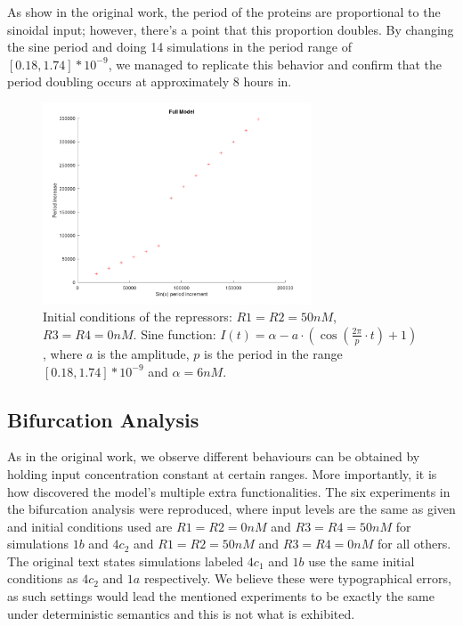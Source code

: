     As show in the original work, the period of the proteins are proportional to the sinoidal input; however, there's a point that this proportion doubles. By changing the sine period and doing 14 simulations in the period range of $[0.18, 1.74] * 10^{-9}$, we managed to replicate this behavior and confirm that the period doubling occurs at approximately 8 hours in.

    \begin{figure}[!htbp]
      \centering
      \includegraphics[width=0.71\textwidth]{img/period.png}
      \caption{Initial conditions of the repressors: $R1 = R2 = 50nM$, $R3 = R4 = 0nM$. Sine function: $I(t) = \alpha - a\cdot(\cos(\frac{2\pi}{p}\cdot t) + 1)$, where $a$ is the amplitude, $p$ is the period in the range $[0.18, 1.74] * 10^{-9}$ and $\alpha = 6nM$.}
      \label{fig.bifurcation-1a}
    \end{figure}

  \subsection{Bifurcation Analysis}

    As in the original work, we observe different behaviours can be obtained by holding input concentration constant at certain ranges.
    More importantly, it is how \citet{originals} discovered the model's multiple extra functionalities.
    The six experiments in the bifurcation analysis were reproduced, where input levels are the same as given and initial conditions used are $R1=R2=0nM$ and $R3=R4=50nM$ for simulations $1b$ and $4c_{2}$ and $R1=R2=50nM$ and $R3=R4=0nM$ for all others.
    The original text states simulations labeled $4c_{1}$ and $1b$ use the same initial conditions as $4c_{2}$ and $1a$ respectively.
    We believe these were typographical errors, as such settings would lead the mentioned experiments to be exactly the same under deterministic semantics and this is not what is exhibited.

